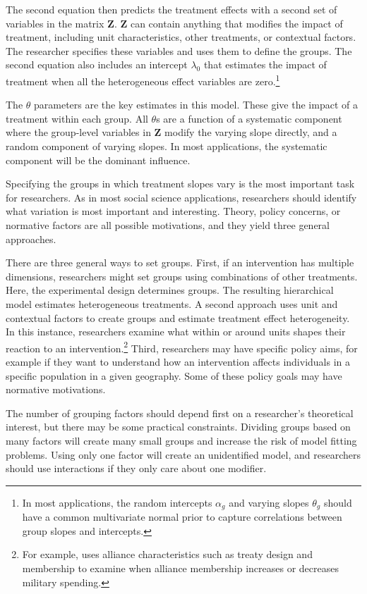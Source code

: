 \documentclass[12pt]{article}
\begin{document}
The second equation then predicts the treatment effects with a second set of variables in the matrix \textbf{Z}. 
\textbf{Z} can contain anything that modifies the impact of treatment, including unit characteristics, other treatments, or contextual factors. 
The researcher specifies these variables and uses them to define the groups. 
The second equation also includes an intercept $\lambda_0$ that estimates the impact of treatment when all the heterogeneous effect variables are zero.\footnote{In most applications, the random intercepts $\alpha_g$ and varying slopes $\theta_g$ should have a common multivariate normal prior to capture correlations between group slopes and intercepts.}


The $\theta$ parameters are the key estimates in this model.
These give the impact of a treatment within each group.
All $\theta$s are a function of a systematic component where the group-level variables in \textbf{Z} modify the varying slope directly, and a random component of varying slopes. 
In most applications, the systematic component will be the dominant influence. 


Specifying the groups in which treatment slopes vary is the most important task for researchers. 
As in most social science applications, researchers should identify what variation is most important and interesting. 
Theory, policy concerns, or normative factors are all possible motivations, and they yield three general approaches. 


There are three general ways to set groups.
First, if an intervention has multiple dimensions, researchers might set groups using combinations of other treatments.
Here, the experimental design determines groups. 
The resulting hierarchical model estimates heterogeneous treatments. 
A second approach uses unit and contextual factors to create groups and estimate treatment effect heterogeneity. 
In this instance, researchers examine what within or around units shapes their reaction to an intervention.\footnote{For example, \citet{Alley2021isq} uses alliance characteristics such as treaty design and membership to examine when alliance membership increases or decreases military spending.} 
Third, researchers may have specific policy aims, for example if they want to understand how an intervention affects individuals in a specific population in a given geography. 
Some of these policy goals may have normative motivations.


The number of grouping factors should depend first on a researcher's theoretical interest, but there may be some practical constraints. 
Dividing groups based on many factors will create many small groups and increase the risk of model fitting problems. 
Using only one factor will create an unidentified model, and researchers should use interactions if they only care about one modifier. 
\end{document}
